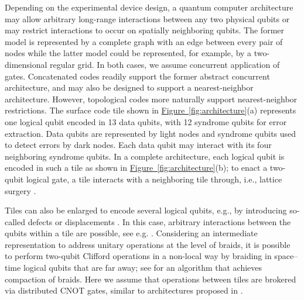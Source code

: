 \documentclass[conference]{IEEEtran}
\newcommand{\fig}[1]{\hyperref[fig:#1]{Figure~\ref*{fig:#1}}}
\begin{document}
Depending on the experimental device design, a quantum computer architecture may allow arbitrary long-range interactions between any two physical qubits or may restrict interactions to occur on spatially neighboring qubits. The former model is represented by a complete graph with an edge between every pair of nodes while the latter model could be represented, for example, by a two-dimensional regular grid. In both cases, we assume concurrent application of gates. 
Concatenated codes readily support the former abstract concurrent architecture, and may also be designed to support a nearest-neighbor architecture.  However, topological codes more naturally support nearest-neighbor restrictions.
The surface code tile shown in \fig{architecture}(a) represents one logical qubit encoded in 13 data qubits, with 12 syndrome qubits for error extraction.  Data qubits are represented by light nodes and syndrome qubits used to detect errors by dark nodes.  Each data qubit may interact with its four neighboring syndrome qubits.  In a complete architecture, each logical qubit is encoded in such a tile as shown in \fig{architecture}(b); to enact a two-qubit logical gate, a tile interacts with a neighboring tile through, i.e., lattice surgery \cite{HFD+:2012}.

Tiles can also be enlarged to encode several logical qubits, e.g., by introducing so-called defects \cite{Fowl12f} or displacements \cite{HG:2015}. In this case, arbitrary interactions between the qubits within a tile are possible, see e.g. \cite{HFD+:2012,PF:2015,LB:2015}. 
Considering an intermediate representation to address unitary operations at the level of braids, it is possible to perform two-qubit Clifford operations in a non-local way by braiding in space--time logical qubits that are far away; see \cite{PF:2013} for an algorithm that achieves compaction of braids. Here we assume that operations between tiles are brokered via distributed CNOT gates, similar to architectures proposed in \cite{MFC:2011,vMNM+:2006,vMeter:2014,LB:2015}. 
\end{document}
